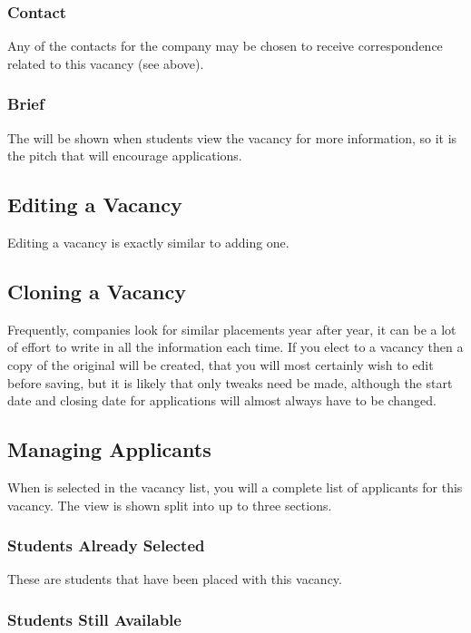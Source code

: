 \documentclass[12 pt]{book}
\begin{document}
\subsubsection{Contact}

Any of the contacts for the company may be chosen to receive correspondence
related to this vacancy (see above).

\subsubsection{Brief}

The  will be shown when students view the vacancy for more
information, so it is the pitch that will encourage applications.

\subsection{Editing a Vacancy}

Editing a vacancy is exactly similar to adding one.

\subsection{Cloning a Vacancy}

Frequently, companies look for similar placements year after year, it can be
a lot of effort to write in all the information each time. If you elect to
 a vacancy then a copy of the original will be created, that
you will most certainly wish to edit before saving, but it is likely that
only tweaks need be made, although the start date and closing date for 
applications will almost always have to be changed.

\subsection{Managing Applicants}

When  is selected in the vacancy list, you will a 
complete list of applicants for this vacancy. The view is shown split into
up to three sections.

\subsubsection{Students Already Selected}

These are students that have been placed with this vacancy.

\subsubsection{Students Still Available}
\end{document}
